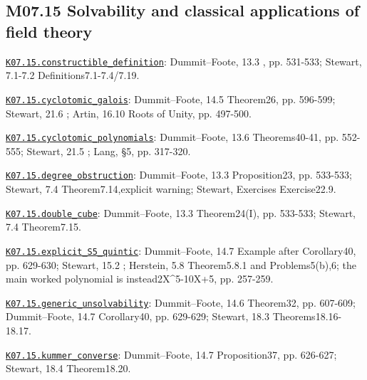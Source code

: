 \subsection*{M07.15 Solvability and classical applications of field theory}
\par\smallskip\noindent\hypertarget{src:K07.15.constructible_definition}{}\label{src:K07.15.constructible_definition}\hyperref[K07.15.constructible_definition]{\texttt{K07.15.constructible\_definition}}: Dummit--Foote, 13.3 , pp. 531-533; Stewart, 7.1-7.2 Definitions7.1-7.4/7.19.
\par\smallskip\noindent\hypertarget{src:K07.15.cyclotomic_galois}{}\label{src:K07.15.cyclotomic_galois}\hyperref[K07.15.cyclotomic_galois]{\texttt{K07.15.cyclotomic\_galois}}: Dummit--Foote, 14.5 Theorem26, pp. 596-599; Stewart, 21.6 ; Artin, 16.10 Roots of Unity, pp. 497-500.
\par\smallskip\noindent\hypertarget{src:K07.15.cyclotomic_polynomials}{}\label{src:K07.15.cyclotomic_polynomials}\hyperref[K07.15.cyclotomic_polynomials]{\texttt{K07.15.cyclotomic\_polynomials}}: Dummit--Foote, 13.6 Theorems40-41, pp. 552-555; Stewart, 21.5 ; Lang, §5, pp. 317-320.
\par\smallskip\noindent\hypertarget{src:K07.15.degree_obstruction}{}\label{src:K07.15.degree_obstruction}\hyperref[K07.15.degree_obstruction]{\texttt{K07.15.degree\_obstruction}}: Dummit--Foote, 13.3 Proposition23, pp. 533-533; Stewart, 7.4 Theorem7.14,explicit warning; Stewart, Exercises Exercise22.9.
\par\smallskip\noindent\hypertarget{src:K07.15.double_cube}{}\label{src:K07.15.double_cube}\hyperref[K07.15.double_cube]{\texttt{K07.15.double\_cube}}: Dummit--Foote, 13.3 Theorem24(I), pp. 533-533; Stewart, 7.4 Theorem7.15.
\par\smallskip\noindent\hypertarget{src:K07.15.explicit_S5_quintic}{}\label{src:K07.15.explicit_S5_quintic}\hyperref[K07.15.explicit_S5_quintic]{\texttt{K07.15.explicit\_S5\_quintic}}: Dummit--Foote, 14.7 Example after Corollary40, pp. 629-630; Stewart, 15.2 ; Herstein, 5.8 Theorem5.8.1 and Problems5(b),6; the main worked polynomial is instead2X\textasciicircum{}5-10X+5, pp. 257-259.
\par\smallskip\noindent\hypertarget{src:K07.15.generic_unsolvability}{}\label{src:K07.15.generic_unsolvability}\hyperref[K07.15.generic_unsolvability]{\texttt{K07.15.generic\_unsolvability}}: Dummit--Foote, 14.6 Theorem32, pp. 607-609; Dummit--Foote, 14.7 Corollary40, pp. 629-629; Stewart, 18.3 Theorems18.16-18.17.
\par\smallskip\noindent\hypertarget{src:K07.15.kummer_converse}{}\label{src:K07.15.kummer_converse}\hyperref[K07.15.kummer_converse]{\texttt{K07.15.kummer\_converse}}: Dummit--Foote, 14.7 Proposition37, pp. 626-627; Stewart, 18.4 Theorem18.20.
